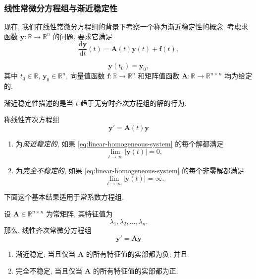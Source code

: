 \subsubsection{线性常微分方程组与渐近稳定性}\label{subsec:linear-asymptotic-stability}

现在, 我们在线性常微分方程组的背景下考察一个称为渐近稳定性的概念. 考虑求函数 $\bm{y}:\mathbb{R}\to\mathbb{R}^n$ 的问题, 要求它满足
\begin{equation}\label{eq:linear-nonhomogeneous-system}
\dfrac{\mathrm{d}\bm{y}}{\mathrm{d}t}(t)=\bm{A}(t)\bm{y}(t)+\bm{f}(t),
\end{equation}

\begin{equation}\label{eq:linear-system-initial-data}
\bm{y}(t_0)=\bm{y}_0,
\end{equation}
其中 $t_0\in\mathbb{R}$, $\bm{y}_0\in\mathbb{R}^n$, 向量值函数 $\bm{f}:\mathbb{R}\to\mathbb{R}^n$ 和矩阵值函数 $\bm{A}:\mathbb{R}\to\mathbb{R}^{n\times n}$ 均为给定的.

渐近稳定性描述的是当 $t$ 趋于无穷时齐次方程组的解的行为.

\begin{Definition}
\label{def:linear-system-asymptotic-stability}
称线性齐次方程组
\begin{equation}\label{eq:linear-homogeneous-system}
\bm{y}'=\bm{A}(t)\bm{y}
\end{equation}

\begin{enumerate}
\item 为\emph{渐近稳定的}, 如果 \eqref{eq:linear-homogeneous-system} 的每个解都满足
\begin{equation}\label{eq:asymptotic-stability-limit}
\lim_{t\to\infty}|\bm{y}(t)|=0,
\end{equation}

\item 为\emph{完全不稳定的}, 如果 \eqref{eq:linear-homogeneous-system} 的每个非零解都满足
\begin{equation}\label{eq:complete-instability-limit}
\lim_{t\to\infty}|\bm{y}(t)|=\infty.
\end{equation}
\end{enumerate}
\end{Definition}

下面这个基本结果适用于常系数方程组.

\begin{Theorem}
\label{thm:constant-coefficient-stability}
设 $\bm{A}\in\mathbb{R}^{n\times n}$ 为常矩阵, 其特征值为
\[
\lambda_1,\lambda_2,\ldots,\lambda_n.
\]
那么, 线性齐次常微分方程组
\begin{equation}\label{eq:constant-coefficient-homogeneous-system}
\bm{y}'=\bm{A}\bm{y}
\end{equation}

\begin{enumerate}
\item 渐近稳定, 当且仅当 $\bm{A}$ 的所有特征值的实部都为负; 并且
\item 完全不稳定, 当且仅当 $\bm{A}$ 的所有特征值的实部都为正.
\end{enumerate}
\end{Theorem}

